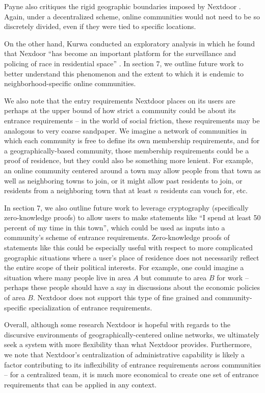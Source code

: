 \documentclass[sigconf,authordraft]{acmart}
\begin{document}
Payne also critiques the rigid geographic boundaries imposed by Nextdoor \cite{payne2017welcome}. Again, under a decentralized scheme, online communities would not need to be so discretely divided, even if they were tied to specific locations.

On the other hand, Kurwa conducted an exploratory analysis in which he found that Nexdoor ``has become an important platform for the surveillance and policing of race in residential space'' \cite{kurwa2019building}. In section 7, we outline future work to better understand this phenomenon and the extent to which it is endemic to neighborhood-specific online communities.

We also note that the entry requirements Nextdoor places on its users are perhaps at the upper bound of how strict a community could be about its entrance requirements -- in the world of social friction, these requirements may be analogous to very coarse sandpaper. We imagine a network of communities in which each community is free to define its own membership requirements, and for a geographically-based community, those membership requirements could be a proof of residence, but they could also be something more lenient. For example, an online community centered around a town may allow people from that town as well as neighboring towns to join, or it might allow past residents to join, or residents from a neighboring town that at least $n$ residents can vouch for, etc. 

In section 7, we also outline future work to leverage cryptography (specifically zero-knowledge proofs) to allow users to make statements like ``I spend at least 50 percent of my time in this town'', which could be used as inputs into a community's scheme of entrance requirements. Zero-knowledge proofs of statements like this could be especially useful with respect to more complicated geographic situations where a user's place of residence does not necessarily reflect the entire scope of their political interests. For example, one could imagine a situation where many people live in area $A$ but commute to area $B$ for work -- perhaps these people should have a say in discussions about the economic policies of area $B$. Nextdoor does not support this type of fine grained and community-specific specialization of entrance requirements.

Overall, although some research Nextdoor is hopeful with regards to the discursive environments of geographically-centered online networks, we ultimately seek a system with more flexibility than what Nextdoor provides. Furthermore, we note that Nextdoor's centralization of administrative capability is likely a factor contributing to its inflexibility of entrance requirements across communities -- for a centralized team, it is much more economical to create one set of entrance requirements that can be applied in any context.
\end{document}

